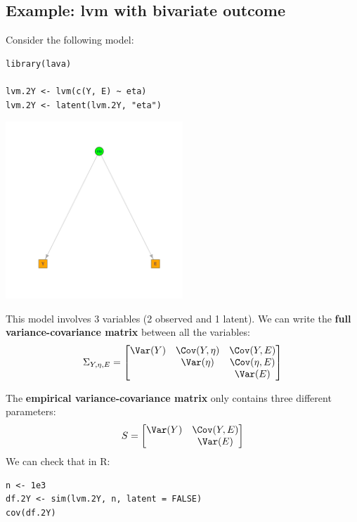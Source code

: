 \documentclass{article}
\begin{document}
\subsection{Example: lvm with bivariate outcome}
\label{sec:org8e5bde5}
Consider the following model:

\lstset{language=r,label= ,caption= ,captionpos=b,numbers=none}
\begin{lstlisting}
library(lava)

lvm.2Y <- lvm(c(Y, E) ~ eta)
lvm.2Y <- latent(lvm.2Y, "eta")
\end{lstlisting}

\begin{center}
\includegraphics[width=0.5\textwidth]{./figures/show-bivariateLVM.pdf}
\end{center}

This model involves 3 variables (2 observed and 1 latent). We can
write the \textbf{full variance-covariance matrix} between all the variables:
\begin{align*}
\Sigma_{Y,\eta,E} = \begin{bmatrix} 
\Var(Y) & \Cov(Y,\eta) & \Cov(Y,E) \\ & \Var(\eta) & \Cov(\eta,E) \\ & & \Var(E)  \\
\end{bmatrix} 
\end{align*}

The \textbf{empirical variance-covariance matrix} only contains three different parameters:
\begin{align*}
S = 
\begin{bmatrix} 
\Var(Y) & \Cov(Y,E) \\ & \Var(E) \\
\end{bmatrix} 
\end{align*}
We can check that in R:
\lstset{language=r,label= ,caption= ,captionpos=b,numbers=none}
\begin{lstlisting}
n <- 1e3
df.2Y <- sim(lvm.2Y, n, latent = FALSE)
cov(df.2Y)
\end{lstlisting}
\end{document}
